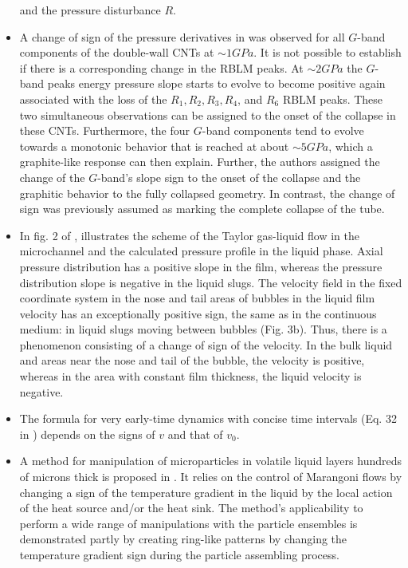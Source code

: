 \documentclass[11pt]{book}
\begin{document}
\begin{itemize}
and the pressure disturbance $R$.
\item A change of sign of the pressure derivatives in \cite{alencar2017pressure}
was observed for all $G$-band components of the double-wall CNTs
at $\sim1GPa$. It is not possible to establish if there is a corresponding
change in the RBLM peaks. At $\sim2GPa$ the $G$-band peaks energy
pressure slope starts to evolve to become positive again associated
with the loss of the $R_{1},R_{2},R_{3},R_{4}$, and $R_{6}$
RBLM peaks. These two simultaneous observations can be assigned to
the onset of the collapse in these CNTs. Furthermore, the four $G$-band
components tend to evolve towards a monotonic behavior that is reached
at about $\sim5GPa$, which a graphite-like response can then explain.
Further, the authors assigned the change of the $G$-band's slope
sign to the onset of the collapse and the graphitic behavior to the
fully collapsed geometry. In contrast, the change of sign was previously
assumed as marking the complete collapse of the tube.
\item In fig. 2 of \cite{abiev2017analysis},
illustrates the scheme of the Taylor gas-liquid flow in the microchannel
and the calculated pressure profile in the liquid phase. Axial pressure
distribution has a positive slope in the film, whereas the pressure
distribution slope is negative in the liquid slugs. The velocity field
in the fixed coordinate system in the nose and tail areas of bubbles
in the liquid film velocity has an exceptionally positive sign, the
same as in the continuous medium: in liquid slugs moving between bubbles
(Fig. 3b). Thus, there is a phenomenon consisting of a change of sign
of the velocity. In the bulk liquid and areas near the nose and tail
of the bubble, the velocity is positive, whereas in the area with
constant film thickness, the liquid velocity is negative.
\item The formula for very early-time dynamics with concise time intervals
(Eq. 32 in \cite{hill2019group})
depends on the signs of $v$ and that of $v_{0}$.
\item A method for manipulation of microparticles in volatile liquid layers
hundreds of microns thick is proposed in \cite{al2021transport}.
It relies on the control of Marangoni flows by changing a sign of
the temperature gradient in the liquid by the local action of the
heat source and/or the heat sink. The method's applicability to perform
a wide range of manipulations with the particle ensembles is demonstrated
partly by creating ring-like patterns by changing the temperature
gradient sign during the particle assembling process.

\end{itemize}
\end{document}
